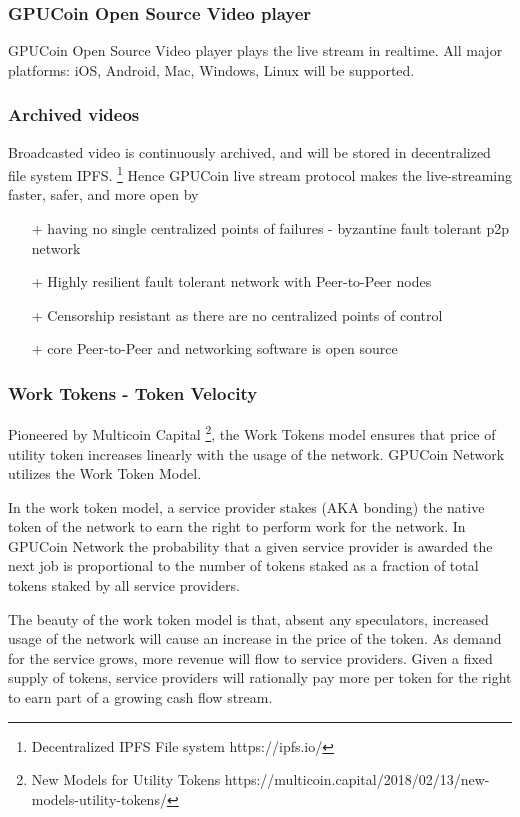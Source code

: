 \documentclass{article}
\begin{document}
\subsubsection{GPUCoin Open Source Video player}
GPUCoin Open Source Video player plays the live stream in realtime. All major platforms: iOS, Android, Mac, Windows, Linux will be supported.

\subsubsection{Archived videos}
Broadcasted video is continuously archived, and will be stored in decentralized file system IPFS. \footnote{Decentralized IPFS File system https://ipfs.io/} Hence GPUCoin live stream protocol makes the live-streaming faster, safer, and more open by
\begin{itemize}
 \item[+]having no single centralized points of failures - byzantine fault tolerant p2p network
 \item[+]Highly resilient fault tolerant network with Peer-to-Peer nodes
 \item[+]Censorship resistant as there are no centralized points of control
 \item[+]core Peer-to-Peer and networking software is open source
\end{itemize}


\subsubsection{Work Tokens - Token Velocity} %
\label{ssub:work_tokens_token_velocity}
Pioneered by Multicoin Capital \footnote{New Models for Utility Tokens
 https://multicoin.capital/2018/02/13/new-models-utility-tokens/}, the Work Tokens model ensures that price of utility token increases linearly with the usage of the network. GPUCoin Network utilizes the Work Token Model.

 In the work token model, a service provider stakes (AKA bonding) the native token of the network to earn the right to perform work for the network. In GPUCoin Network the probability that a given service provider is awarded the next job is proportional to the number of tokens staked as a fraction of total tokens staked by all service providers.

The beauty of the work token model is that, absent any speculators, increased usage of the network will cause an increase in the price of the token. As demand for the service grows, more revenue will flow to service providers. Given a fixed supply of tokens, service providers will rationally pay more per token for the right to earn part of a growing cash flow stream.
\end{document}
